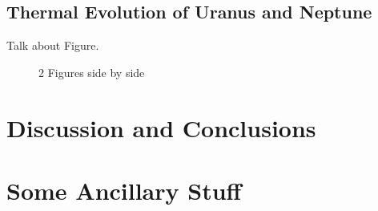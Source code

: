 \documentclass[11pt]{ucscthesisbs}
\begin{document}
\section{Thermal Evolution of Uranus and Neptune}

Talk about Figure.
\begin{figure}%
    \centering
    \qquad
    \caption{2 Figures side by side}%
    \label{fig:example}%
\end{figure}


\chapter{Discussion and Conclusions}





\appendix
\chapter{Some Ancillary Stuff}

\newcommand{\newblock}{}

\end{document}
